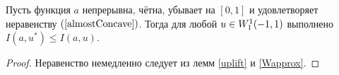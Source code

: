 \begin{cor}
Пусть функция $a$ непрерывна, чётна, убывает на $[0, 1]$ и удовлетворяет неравенству $(\ref{almostConcave})$.
Тогда для любой $u \in W_1^1(-1, 1)$ выполнено $I( a, u^* ) \le I( a, u )$.
\end{cor}

\begin{proof}
Неравенство немедленно следует из лемм \ref{uplift} и \ref{Wapprox}.
\end{proof}
